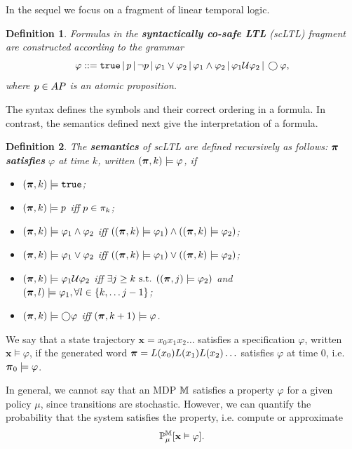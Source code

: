 \documentclass[conference]{IEEEtran}
\newtheorem{definition}{Definition}
\begin{document}
In the sequel we focus on a fragment of linear temporal logic. 
\begin{definition}
  \label{def:gdtl-syntax}
  Formulas in the \textbf{syntactically co-safe LTL} (scLTL) fragment are constructed according to the grammar
  \begin{equation}
    \label{eq:scLTL}
    \varphi ::=  \True \, |\,p \, |\, \lnot p \, |\, \varphi_1 \vee\varphi_2  \, |\, \varphi_1 \land \varphi_2 \, |\, \varphi_1 \ltluntil \varphi_2 \, |\, \ltlnext \varphi, 
  \end{equation}
  where $p\in AP$ is an atomic proposition.
\end{definition}
The syntax defines the symbols and their correct ordering in a formula. In contrast, the semantics defined next give the interpretation of a formula.
\begin{definition}
 The \textbf{semantics} of scLTL are defined recursively as follows: $\boldsymbol{\pi}$ \textbf{satisfies} $\varphi$ at time $k$, written $(\boldsymbol{\pi}, k) \models \varphi$, if
 \begin{itemize}
    \item $(\boldsymbol{\pi}, k) \models \texttt{true}$;
    \item $(\boldsymbol{\pi}, k) \models p$ iff $p \in \pi_k$;
    \item $(\boldsymbol{\pi}, k) \models \varphi_1 \land  \varphi_2  $ iff $ ( (\boldsymbol{\pi}, k) \models \varphi_1 ) \land ( (\boldsymbol{\pi}, k) \models \varphi_2 ) $;
    \item $(\boldsymbol{\pi}, k) \models \varphi_1 \lor  \varphi_2  $ iff $ ( (\boldsymbol{\pi}, k) \models \varphi_1 ) \lor ( (\boldsymbol{\pi}, k) \models \varphi_2 ) $;
    \item $(\boldsymbol{\pi}, k) \models  \varphi_1 \mathcal{U} \varphi_2 $ iff $\exists j \geq k \text{ s.t. } ((\boldsymbol{\pi}, j) \models \varphi_2 ) $ and $(\boldsymbol{\pi}, l) \models \varphi_1, \forall l \in \{k, \ldots j-1\}$;
    \item $(\boldsymbol{\pi}, k) \models \bigcirc \varphi$ iff $(\boldsymbol{\pi}, k+1) \models \varphi$.
 \end{itemize}

\end{definition}
We say that a state trajectory $\mathbf{x} = x_0 x_1 x_2 \ldots$ satisfies a specification $\varphi$, written $\mathbf{x} \models \varphi$, if the generated word $\boldsymbol{\pi} =L(x_0) L(x_1) L(x_2) \ldots$ satisfies $\varphi$ at time 0, i.e. $\boldsymbol{\pi}_0 \models \varphi$.

In general, we cannot say that an MDP $\mathbb{M}$ satisfies a property $\varphi$ for a given policy $\mu$, since transitions are stochastic. However, we can quantify the probability that the system satisfies the property, i.e. compute or approximate
\begin{equation}
  \label{eq:probLTL}
  \mathbb P_{\mu}^\MDP[\mathbf x \vDash \varphi ].
\end{equation}
\end{document}
